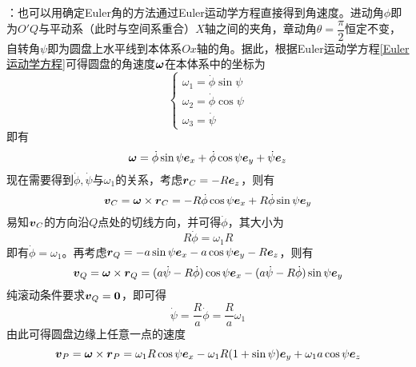 \begin{solution}
：也可以用确定Euler角的方法通过Euler运动学方程直接得到角速度。进动角$\phi$即为$O'Q$与平动系（此时与空间系重合）$X$轴之间的夹角，章动角$\theta = \dfrac{\pi}{2}$恒定不变，自转角$\psi$即为圆盘上水平线到本体系$Ox$轴的角。据此，根据Euler运动学方程\eqref{Euler运动学方程}可得圆盘的角速度$\boldsymbol{\omega}$在本体系中的坐标为
\begin{equation*}
	\begin{cases}
		\omega_1 = \dot{\phi} \sin \psi \\
		\omega_2 = \dot{\phi} \cos \psi \\
		\omega_3 = \dot{\psi}
	\end{cases}
\end{equation*}
即有
\begin{equation*}
	\boldsymbol{\omega} = \dot{\phi} \sin \psi \boldsymbol{e}_x + \dot{\phi} \cos \psi \boldsymbol{e}_y + \dot{\psi} \boldsymbol{e}_z
\end{equation*}
现在需要得到$\dot{\phi},\dot{\psi}$与$\omega_1$的关系，考虑$\boldsymbol{r}_C = -R\boldsymbol{e}_z$，则有
\begin{equation*}
	\boldsymbol{v}_C = \boldsymbol{\omega} \times \boldsymbol{r}_C = -R\dot{\phi} \cos \psi \boldsymbol{e}_x + R\dot{\phi} \sin \psi \boldsymbol{e}_y
\end{equation*}
易知$\boldsymbol{v}_C$的方向沿$Q$点处的切线方向，并可得$\dot{\phi}$，其大小为
\begin{equation*}
	R\dot{\phi} = \omega_1 R
\end{equation*}
即有$\dot{\phi} = \omega_1$。再考虑$\boldsymbol{r}_Q = -a\sin \psi \boldsymbol{e}_x - a\cos \psi \boldsymbol{e}_y - R\boldsymbol{e}_z$，则有
\begin{equation*}
	\boldsymbol{v}_Q = \boldsymbol{\omega} \times \boldsymbol{r}_Q = (a\dot{\psi}-R\dot{\phi}) \cos \psi \boldsymbol{e}_x - (a\dot{\psi}-R\dot{\phi}) \sin \psi \boldsymbol{e}_y
\end{equation*}
纯滚动条件要求$\boldsymbol{v}_Q = \boldsymbol{0}$，即可得
\begin{equation*}
	\dot{\psi} = \frac{R}{a} \dot{\phi} = \frac{R}{a} \omega_1
\end{equation*}
由此可得圆盘边缘上任意一点的速度
\begin{equation*}
	\boldsymbol{v}_P = \boldsymbol{\omega} \times \boldsymbol{r}_P = \omega_1 R \cos \psi \boldsymbol{e}_x - \omega_1 R(1+\sin \psi) \boldsymbol{e}_y + \omega_1 a \cos \psi \boldsymbol{e}_z
\end{equation*}
\end{solution}

